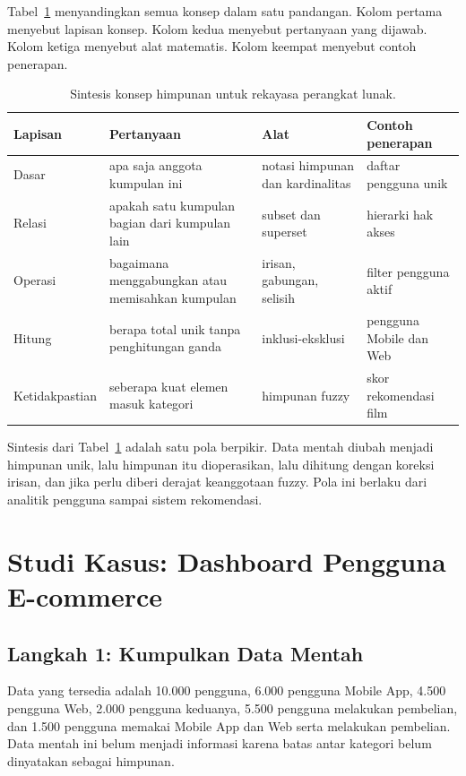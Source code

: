 \documentclass[11pt,a4paper]{article}
\begin{document}
Tabel~\ref{tab:sintesis} menyandingkan semua konsep dalam satu pandangan. Kolom pertama menyebut lapisan konsep. Kolom kedua menyebut pertanyaan yang dijawab. Kolom ketiga menyebut alat matematis. Kolom keempat menyebut contoh penerapan.

\begin{table}[H]
	\centering
	\caption{Sintesis konsep himpunan untuk rekayasa perangkat lunak.}
	\label{tab:sintesis}
	\footnotesize
	\begin{tabularx}{\textwidth}{l X X X}
		\toprule
		Lapisan & Pertanyaan & Alat & Contoh penerapan \\
		\midrule
		Dasar & apa saja anggota kumpulan ini & notasi himpunan dan kardinalitas & daftar pengguna unik \\
		Relasi & apakah satu kumpulan bagian dari kumpulan lain & subset dan superset & hierarki hak akses \\
		Operasi & bagaimana menggabungkan atau memisahkan kumpulan & irisan, gabungan, selisih & filter pengguna aktif \\
		Hitung & berapa total unik tanpa penghitungan ganda & inklusi-eksklusi & pengguna Mobile dan Web \\
		Ketidakpastian & seberapa kuat elemen masuk kategori & himpunan fuzzy & skor rekomendasi film \\
		\bottomrule
	\end{tabularx}
\end{table}

Sintesis dari Tabel~\ref{tab:sintesis} adalah satu pola berpikir. Data mentah diubah menjadi himpunan unik, lalu himpunan itu dioperasikan, lalu dihitung dengan koreksi irisan, dan jika perlu diberi derajat keanggotaan fuzzy. Pola ini berlaku dari analitik pengguna sampai sistem rekomendasi.

\section{Studi Kasus: Dashboard Pengguna E-commerce}

\subsection{Langkah 1: Kumpulkan Data Mentah}

Data yang tersedia adalah 10.000 pengguna, 6.000 pengguna Mobile App, 4.500 pengguna Web, 2.000 pengguna keduanya, 5.500 pengguna melakukan pembelian, dan 1.500 pengguna memakai Mobile App dan Web serta melakukan pembelian. Data mentah ini belum menjadi informasi karena batas antar kategori belum dinyatakan sebagai himpunan.
\end{document}
